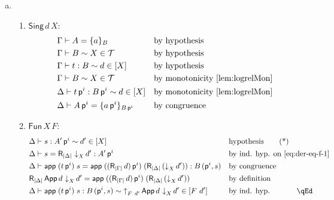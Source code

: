 \documentclass{LMCS}
\theoremstyle{plain}\newtheorem{satz}[thm]{Satz}
\newcommand{\proofLine}[2]{&#1&&\text{#2}}
\newcommand{\exsubs}[2]{( #1, #2)}
\newcommand{\subsTm}[2]{#1\,#2}
\newcommand{\subsTy}[2]{#1\,#2}
\newcommand{\F}[2]{\mathsf{Fun}\,#1\,#2}
\newcommand{\p}{\mathsf{p}}
\newcommand{\appTm}[2]{\mathsf{app}\;#1\;#2} \newcommand{\singTm}[2]{\{#1\}_{#2}}
\newcommand{\dtype}[2]{#1\vdash#2}
\newcommand{\dterm}[3]{#1\vdash#3:#2}
\newcommand{\deqtype}[3]{#1\vdash#2=#3}
\newcommand{\deqterm}[4]{#1\vdash#3=#4:#2}
\newcommand{\lift}[2]{\subsTm{#2}{\p^{#1}}}
\newcommand{\upa}[2]{\mathop{\uparrow}\nolimits_{#1}{#2}}
\newcommand{\da}[2]{\mathop{\downarrow}\nolimits_{#1}{#2}}
\newcommand{\reifyC}[2]{\mathsf{R}_{|#1|}\,#2}
\newcommand{\perT}{\mathcal{T}}
\newcommand{\rel}{\sim}
\newcommand{\iNe}[2]{\mathsf{App}\,#1\,#2}
\newcommand{\iPi}[2]{\mathsf{Fun}\,#1\,#2}
\newcommand{\iSing}[2]{\mathsf{Sing}\,#1\,{#2}}
\begin{document}
{\begin{enumerate}[(a)]
\begin{enumerate}[(1)]
\begin{align*}
            \proofLine{\deqterm{\Gamma}{\F{A'}{B}}
              {t}{\reifyC{\Gamma}{\da{\iPi{X}{F}}{f}}}}{by trans.}
        \end{align*}
    \end{enumerate}
  \item\hfill
    \begin{enumerate}[(1)]
    \item $\iSing{d}{X}$:
      \begin{align*}
        \proofLine{\deqtype{\Gamma}{A}{\singTm{a}{B}}}{by hypothesis} \\
        \proofLine{\dtype{\Gamma}{B}\rel X\in \perT}{by hypothesis} \\
        \proofLine{\dterm{\Gamma}{B}{t} \rel d\in [X]}{by hypothesis}\\
        \proofLine{\dtype{\Gamma}{B}\rel X\in \perT}{by monotonicity \ref{lem:logrelMon}} \\
        \proofLine{\dterm{\Delta}{\lift{i}{B}}{\lift{i}{t}} \rel d\in [X]}{by monotonicity \ref{lem:logrelMon}}\\
        \proofLine{\deqtype{\Delta}{\lift{i}{A}}{\singTm{\lift{i}{a}}{\lift{i}{B}}}}{by congruence} 
      \end{align*}
    \item $\iPi{X}{F}$: 
      \begin{align*}
        \proofLine{\dterm{\Delta}{\lift{i}{A'}}{s}\rel d'\in [X]}{hypothesis} \tag{*}\label{eq:der-eq-f-1}\\
        \proofLine{\deqterm{\Delta}{\lift{i}{A'}}{s}{\reifyC{\Delta}{\da{X}{d'}}}}{by ind. hyp. on \eqref{eq:der-eq-f-1}}\\
        \proofLine{\deqterm{\Delta}{\subsTy{B}{\exsubs{\p^i}{s}}}{\appTm{(\lift{i}{t})}{s}}
          {\appTm{(\lift{i}{(\reifyC{\Gamma}{d})})}{(\reifyC{\Delta}{(\da{X}{d'}})})}}{by congruence} \\
        \proofLine{\reifyC{\Delta} {\iNe{d}{\da{X}{d'}}}=\appTm{(\lift{i}{(\reifyC{\Gamma}{d})})}{(\reifyC{\Delta}{(\da{X}{d'}})})}
        {by definition}\\
        \proofLine{\dterm{\Delta}{\subsTy{B}{\exsubs{\p^i}{s}}}{\appTm{(\lift{i}{t})}{s}}
          \rel \upa{F\ d'}{\iNe{d}{\da{X}{d'}}}\in [F\ d']}{by ind. hyp.}\rlap{\hbox to 56pt{\hfill\qEd}}
      \end{align*}
    \end{enumerate}
  \end{enumerate}
}
\end{document}
